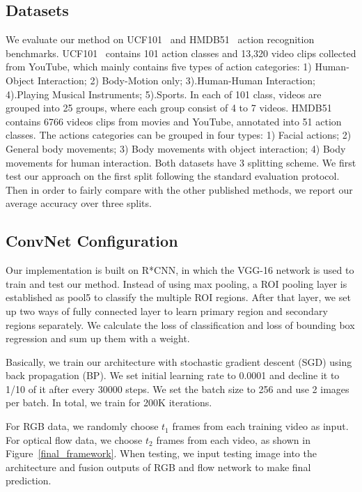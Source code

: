 \documentclass[10pt,twocolumn,letterpaper]{article}
\begin{document}
\subsection{Datasets}
We evaluate our method on UCF101~\cite{soomro2012ucf101} and HMDB51~\cite{Kuehne11} action recognition benchmarks. UCF101~\cite{soomro2012ucf101} contains 101 action classes and 13,320 video clips collected from YouTube, which mainly contains five types of action categories: 1) Human-Object Interaction; 2) Body-Motion only; 3).Human-Human Interaction; 4).Playing Musical Instruments; 5).Sports. In each of 101 class, videos are grouped into 25 groups, where each group consist of 4 to 7 videos. HMDB51~\cite{Kuehne11} contains 6766 videos clips from movies and YouTube, annotated into 51 action classes. The actions categories can be grouped in four types: 1) Facial actions; 2) General body movements; 3) Body movements with object interaction; 4) Body movements for human interaction. Both datasets have 3 splitting scheme. We first test our approach on the first split following the standard evaluation protocol. Then in order to fairly compare with the other published methods, we report our average accuracy over three splits.

\subsection{ConvNet Configuration}
Our implementation is built on R*CNN, in which the VGG-16 network is used to train and test our method. Instead of using max pooling, a ROI pooling layer is established as pool5 to classify the multiple ROI regions. After that layer, we set up two ways of fully connected layer to learn primary region and secondary regions separately. We calculate the loss of classification and loss of bounding box regression and sum up them with a weight. 

Basically, we train our architecture with stochastic gradient descent (SGD) using back propagation (BP). We set initial learning rate to 0.0001 and decline it to 1/10 of it after every 30000 steps. We set the batch size to 256 and use 2 images per batch. In total, we train for 200K iterations. 

For RGB data, we randomly choose $t_{1}$ frames from each training video as input. For optical flow data, we choose $t_{2}$ frames from each video, as shown in Figure~\ref{final_framework}. When testing, we input testing image into the architecture and fusion outputs of RGB and flow network to make final prediction. 
\end{document}

